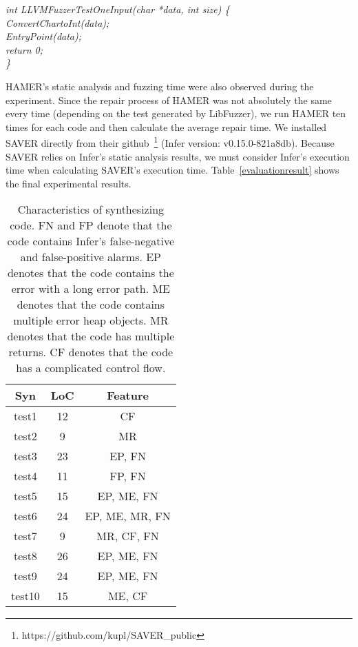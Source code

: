 \documentclass[a4paper,11pt,oneside,openany]{book}
\begin{document}
\begin{minipage}{\textwidth}
    \vspace{0.2cm}
    \textsl{\hspace{0.3cm}int LLVMFuzzerTestOneInput(char *data, int size) \{\\\hspace{0.6cm}ConvertChartoInt(data);\\\hspace{0.6cm}EntryPoint(data);\\\hspace{0.6cm}return 0;\\\hspace{0.3cm}\}}
    \vspace{0.2cm}
\end{minipage}
HAMER's static analysis and fuzzing time were also observed during the experiment. Since the repair process of HAMER was not absolutely the same every time (depending on the test generated by LibFuzzer), we run HAMER ten times for each code and then calculate the average repair time. We installed SAVER directly from their github~\footnote{https://github.com/kupl/SAVER\_public} (Infer version: v0.15.0-821a8db). Because SAVER relies on Infer's static analysis results, we must consider Infer's execution time when calculating SAVER's execution time. Table~\ref{evaluationresult} shows the final experimental results.



\begin{table}[t]
  \caption[Characteristics of synthesizing code]{Characteristics of synthesizing code. FN and FP denote that the code contains Infer's false-negative and false-positive alarms. EP denotes that the code contains the error with a long error path. ME denotes that the code contains multiple error heap objects. MR denotes that the code has multiple returns. CF denotes that the code has a complicated control flow.}
  \label{syncode}
  \centering
  \begin{tabular}{ccc}
   Syn & LoC  &  Feature \\
    \hline
    test1     & 12  &  CF \\
    test2     & 9   &  MR \\
    test3     & 23  &  EP, FN \\
    test4      & 11 &  FP, FN \\
    test5      & 15 &  EP, ME, FN \\
    test6      & 24 &  EP, ME, MR, FN \\
    test7      & 9   &  MR, CF, FN \\
    test8      & 26 &  EP, ME, FN \\
    test9     & 24  &  EP, ME, FN \\
    test10   & 15  &  ME, CF \\
    \hline
  \end{tabular}
\end{table}
\end{document}
